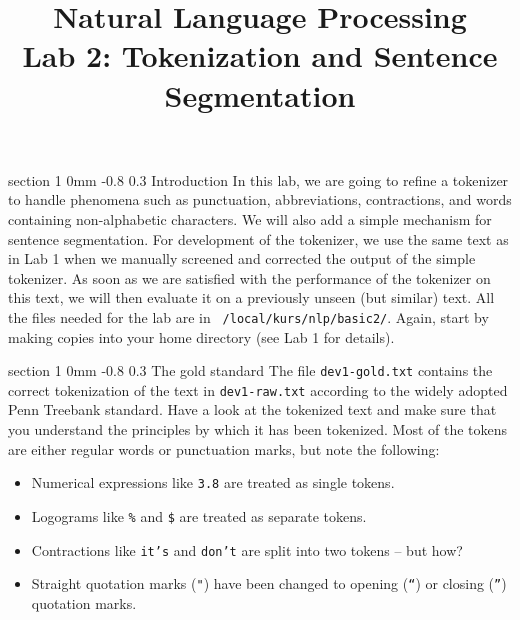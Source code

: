 \documentclass[11pt]{article}
\title{{\LARGE Natural Language Processing}\\[1.5mm]{\large Lab 2: Tokenization and Sentence Segmentation}}
\author{}
\date{} %
\makeatletter
\newcommand{\newsec}[2]{\section{#1}\label{sec:#2}\noindent}
\renewcommand{\section}{\@startsection
{section}%
{1}%
{0mm}%
{-0.8\baselineskip}%
{0.3\baselineskip}%
{\bfseries\large}}%
\makeatother
\begin{document}
 

\maketitle
\vspace{-2mm} \newsec{Introduction}{intro}%
In this lab, we are going to refine a tokenizer to handle
phenomena such as punctuation, abbreviations, contractions, and words
containing non-alphabetic characters. We will also add a simple
mechanism for sentence segmentation. For development of the tokenizer,
we use the same text as in Lab 1 when we manually screened and
corrected the output of the simple tokenizer. As soon as we are
satisfied with the performance of the tokenizer on this text, we will
then evaluate it on a previously unseen (but similar) text. All the
files needed for the lab are in {\tt
  /local/kurs/nlp/basic2/}. Again, start by making copies into your home
directory (see Lab 1 for details).

\newsec{The gold standard}{gold}%
The file {\tt dev1-gold.txt} contains the correct tokenization of the
text in {\tt dev1-raw.txt} according to the widely adopted Penn
Treebank standard.  Have a look at the tokenized text and make sure
that you understand the principles by which it has been
tokenized. Most of the tokens are either regular words or punctuation
marks, but note the following:
\begin{itemize}[noitemsep,topsep=0.2cm]
\item Numerical expressions like {\tt 3.8} are treated as single
  tokens.
\item Logograms like {\tt \%} and {\tt \$} are treated as separate
  tokens.
\item Contractions like {\tt it's} and {\tt don't} are split into two
  tokens -- but how?
\item Straight quotation marks ({\tt "}) have been changed to opening
  ({\tt ``}) or closing ({\tt ''}) quotation marks.
\end{itemize}
\end{document}
